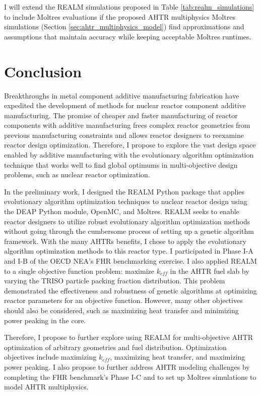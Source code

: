 I will extend the REALM simulations proposed in Table \ref{tab:realm_simulations} 
to include Moltres evaluations if the proposed \gls{AHTR} multiphysics
Moltres simulations (Section \ref{sec:ahtr_multiphysics_model}) find approximations 
and assumptions that maintain accuracy while keeping acceptable Moltres runtimes.

\section{Conclusion}
Breakthroughs in metal component additive manufacturing fabrication have 
expedited the development of methods for nuclear reactor component additive 
manufacturing.
The promise of cheaper and faster manufacturing of reactor components with 
additive manufacturing frees complex reactor geometries from previous manufacturing 
constraints and allows reactor designers to reexamine reactor design optimization. 
Therefore, I propose to explore the vast design space enabled by 
additive manufacturing with the evolutionary algorithm optimization technique 
that works well to find global optimums in multi-objective design problems, 
such as nuclear reactor optimization. 

In the preliminary work, I designed the \gls{REALM} Python package that applies 
evolutionary algorithm optimization techniques to nuclear reactor design using 
the \gls{DEAP} Python module, OpenMC, and Moltres.
\gls{REALM} seeks to enable reactor designers to utilize 
robust evolutionary algorithm optimization methods without going 
through the cumbersome process of setting up a genetic algorithm framework.
With the many \glspl{AHTR} benefits, I chose to apply the evolutionary 
algorithm optimization methods to this reactor type.
I participated in Phase I-A and I-B of the \acrfull{OECD} \gls{NEA}'s \gls{FHR} 
benchmarking exercise. 
I also applied \gls{REALM} to a single objective function problem: maximize 
$k_{eff}$ in the \gls{AHTR} fuel slab by varying the \gls{TRISO} particle 
packing fraction distribution. 
This problem demonstrated the effectiveness and robustness of genetic algorithms 
at optimizing reactor parameters for an objective function. 
However, many other objectives should also be considered, such as maximizing heat 
transfer and minimizing power peaking in the core.

Therefore, I propose to further explore using \gls{REALM} for multi-objective 
\gls{AHTR} optimization of arbitrary geometries and fuel distribution.
Optimization objectives include maximizing $k_{eff}$, maximizing heat transfer, 
and maximizing power peaking. 
I also propose to further address \gls{AHTR} modeling challenges by completing 
the \gls{FHR} benchmark's Phase I-C and to set up Moltres simulations to model 
\gls{AHTR} multiphysics.